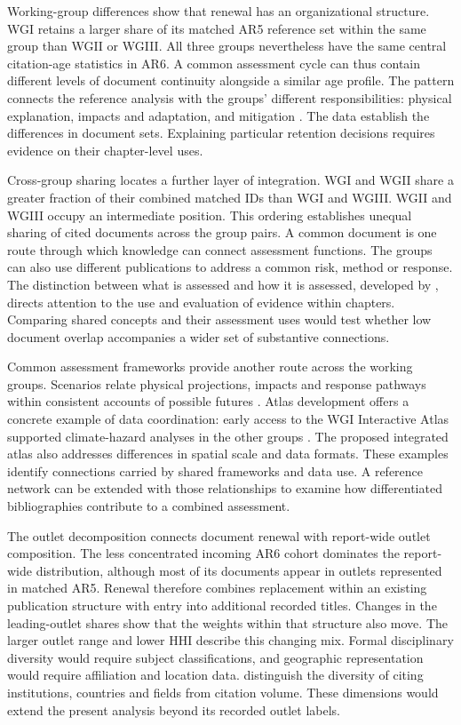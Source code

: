 \documentclass[11pt,a4paper]{article}
\begin{document}
Working-group differences show that renewal has an organizational structure. WGI retains a larger share of its matched AR5 reference set within the same group than WGII or WGIII. All three groups nevertheless have the same central citation-age statistics in AR6. A common assessment cycle can thus contain different levels of document continuity alongside a similar age profile. The pattern connects the reference analysis with the groups' different responsibilities: physical explanation, impacts and adaptation, and mitigation \citep{ipcc2022wg2,ipcc2022wg3,ipcc2023synthesis}. The data establish the differences in document sets. Explaining particular retention decisions requires evidence on their chapter-level uses.

Cross-group sharing locates a further layer of integration. WGI and WGII share a greater fraction of their combined matched IDs than WGI and WGIII. WGII and WGIII occupy an intermediate position. This ordering establishes unequal sharing of cited documents across the group pairs. A common document is one route through which knowledge can connect assessment functions. The groups can also use different publications to address a common risk, method or response. The distinction between what is assessed and how it is assessed, developed by \citet{nalau2024assessment}, directs attention to the use and evaluation of evidence within chapters. Comparing shared concepts and their assessment uses would test whether low document overlap accompanies a wider set of substantive connections.

Common assessment frameworks provide another route across the working groups. Scenarios relate physical projections, impacts and response pathways within consistent accounts of possible futures \citep{pirani2024scenarios}. Atlas development offers a concrete example of data coordination: early access to the WGI Interactive Atlas supported climate-hazard analyses in the other groups \citep{alegria2024atlas}. The proposed integrated atlas also addresses differences in spatial scale and data formats. These examples identify connections carried by shared frameworks and data use. A reference network can be extended with those relationships to examine how differentiated bibliographies contribute to a combined assessment.

The outlet decomposition connects document renewal with report-wide outlet composition. The less concentrated incoming AR6 cohort dominates the report-wide distribution, although most of its documents appear in outlets represented in matched AR5. Renewal therefore combines replacement within an existing publication structure with entry into additional recorded titles. Changes in the leading-outlet shares show that the weights within that structure also move. The larger outlet range and lower HHI describe this changing mix. Formal disciplinary diversity would require subject classifications, and geographic representation would require affiliation and location data. \citet{huang2024openaccess} distinguish the diversity of citing institutions, countries and fields from citation volume. These dimensions would extend the present analysis beyond its recorded outlet labels.
\end{document}
